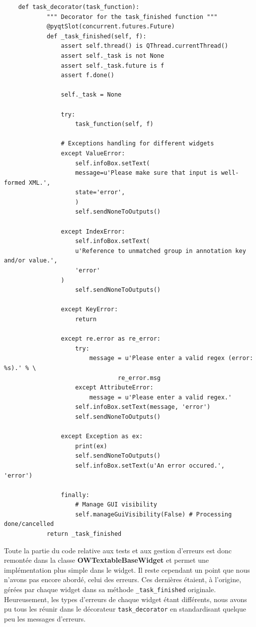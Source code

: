 \documentclass{article}
\begin{document}
\begin{verbatim}
    def task_decorator(task_function):
            """ Decorator for the task_finished function """
            @pyqtSlot(concurrent.futures.Future)
            def _task_finished(self, f):
                assert self.thread() is QThread.currentThread()
                assert self._task is not None
                assert self._task.future is f
                assert f.done()

                self._task = None
                
                try:
                    task_function(self, f)
                
                # Exceptions handling for different widgets
                except ValueError:
                    self.infoBox.setText(
                    message=u'Please make sure that input is well-formed XML.',
                    state='error',
                    )
                    self.sendNoneToOutputs()
                    
                except IndexError:
                    self.infoBox.setText(
                    u'Reference to unmatched group in annotation key and/or value.',
                    'error'
                )
                    self.sendNoneToOutputs()

                except KeyError:
                    return
                
                except re.error as re_error:
                    try:
                        message = u'Please enter a valid regex (error: %s).' % \
                                re_error.msg
                    except AttributeError:
                        message = u'Please enter a valid regex.'
                    self.infoBox.setText(message, 'error')
                    self.sendNoneToOutputs()

                except Exception as ex:
                    print(ex)
                    self.sendNoneToOutputs()
                    self.infoBox.setText(u'An error occured.', 'error')

                finally:
                    # Manage GUI visibility
                    self.manageGuiVisibility(False) # Processing done/cancelled
            return _task_finished
\end{verbatim}

Toute la partie du code relative aux tests et aux gestion d'erreurs est donc remontée dans la classe \textbf{OWTextableBaseWidget} et permet une implémentation plus simple dans le widget.
\newline
Il reste cependant un point que nous n'avons pas encore abordé, celui des erreurs. Ces dernières étaient, à l'origine, gérées par chaque widget dans sa méthode \texttt{\_task\_finished} originale. Heureusement, les types d'erreurs de chaque widget étant différents, nous avons pu tous les réunir dans le décorateur \texttt{task\_decorator} en standardisant quelque peu les messages d'erreurs.
\end{document}
